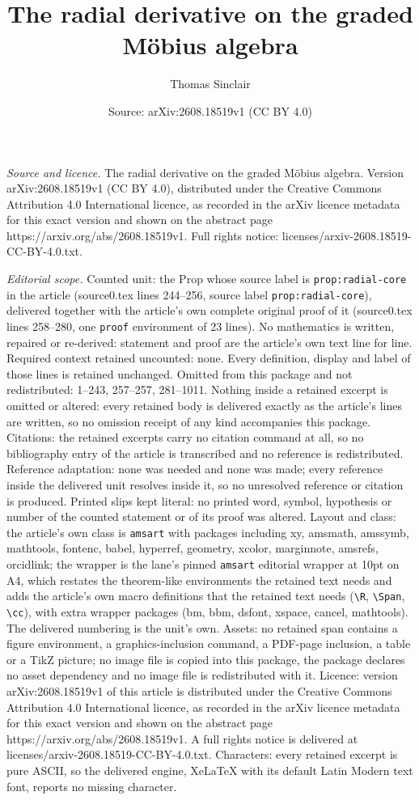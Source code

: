 \documentclass[10pt,a4paper]{amsart}
\title[The radial derivative on the graded M\"obius algebra]{The radial derivative on the graded M\"obius algebra}
\author{Thomas Sinclair}
\date{Source: arXiv:2608.18519v1 (CC BY 4.0)}
\begin{document}
\maketitle

\noindent\emph{Source and licence.} The radial derivative on the graded M\"obius algebra. Version arXiv:2608.18519v1 (CC BY 4.0), distributed under the Creative Commons Attribution 4.0 International licence, as recorded in the arXiv licence metadata for this exact version and shown on the abstract page https://arxiv.org/abs/2608.18519v1. Full rights notice: licenses/arxiv-2608.18519-CC-BY-4.0.txt.\par\smallskip

\noindent\textit{Editorial scope.} Counted unit: the Prop whose source label is \texttt{prop:radial-core} in the article (source0.tex lines 244--256, source label \texttt{prop:radial-core}), delivered together with the article's own complete original proof of it (source0.tex lines 258--280, one \texttt{proof} environment of 23 lines). No mathematics is written, repaired or re-derived: statement and proof are the article's own text line for line. Required context retained uncounted: none. Every definition, display and label of those lines is retained unchanged. Omitted from this package and not redistributed: 1--243, 257--257, 281--1011. Nothing inside a retained excerpt is omitted or altered: every retained body is delivered exactly as the article's lines are written, so no omission receipt of any kind accompanies this package. Citations: the retained excerpts carry no citation command at all, so no bibliography entry of the article is transcribed and no reference is redistributed. Reference adaptation: none was needed and none was made; every reference inside the delivered unit resolves inside it, so no unresolved reference or citation is produced. Printed slips kept literal: no printed word, symbol, hypothesis or number of the counted statement or of its proof was altered. Layout and class: the article's own class is \texttt{amsart} with packages including xy, amsmath, amssymb, mathtools, fontenc, babel, hyperref, geometry, xcolor, marginnote, amsrefs, orcidlink; the wrapper is the lane's pinned \texttt{amsart} editorial wrapper at 10pt on A4, which restates the theorem-like environments the retained text needs and adds the article's own macro definitions that the retained text needs (\texttt{\textbackslash R}, \texttt{\textbackslash Span}, \texttt{\textbackslash cc}), with extra wrapper packages (bm, bbm, dsfont, xspace, cancel, mathtools). The delivered numbering is the unit's own. Assets: no retained span contains a figure environment, a graphics-inclusion command, a PDF-page inclusion, a table or a TikZ picture; no image file is copied into this package, the package declares no asset dependency and no image file is redistributed with it. Licence: version arXiv:2608.18519v1 of this article is distributed under the Creative Commons Attribution 4.0 International licence, as recorded in the arXiv licence metadata for this exact version and shown on the abstract page https://arxiv.org/abs/2608.18519v1. A full rights notice is delivered at licenses/arxiv-2608.18519-CC-BY-4.0.txt. Characters: every retained excerpt is pure ASCII, so the delivered engine, XeLaTeX with its default Latin Modern text font, reports no missing character.
\end{document}
